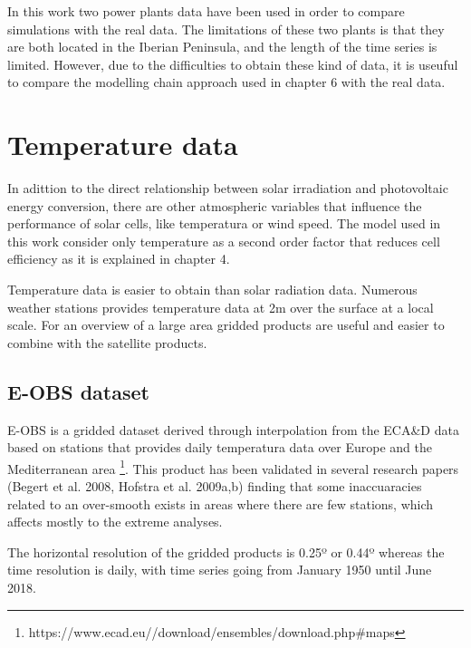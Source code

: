 In this work two power plants data have been used in order to compare simulations with the real data. The limitations of these two plants is that they are both located in the Iberian Peninsula, and the length of the time series is limited. However, due to the difficulties to obtain these kind of data, it is useuful to compare the modelling chain approach used in chapter 6 with the real data.


\section{Temperature data}

  In adittion to the direct relationship between solar irradiation and photovoltaic energy conversion, there are other atmospheric variables that influence the performance of solar cells, like temperatura or wind speed. The model used in this work consider only temperature as a second order factor that reduces cell efficiency as it is explained in chapter 4.
 
  Temperature data is easier to obtain than solar radiation data. Numerous weather stations provides temperature data at 2m over the surface at a local scale. For an overview of a large area gridded products are useful and easier to combine with the satellite products.

\subsection{E-OBS dataset}
  
  E-OBS is a gridded dataset derived through interpolation from the ECA\&D data based on stations that provides daily temperatura data over Europe and the Mediterranean area \footnote{https://www.ecad.eu//download/ensembles/download.php#maps}. This product has been validated in several research papers (Begert et al. 2008, Hofstra et al. 2009a,b) finding that some inaccuaracies related to an over-smooth exists in areas where there are few stations, which affects mostly to the extreme analyses.

The horizontal resolution of the gridded products is 0.25º or 0.44º whereas the time resolution is daily, with time series going from January 1950 until June 2018.  

